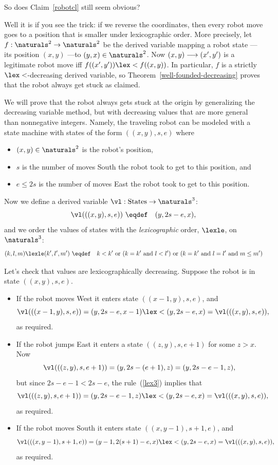 \begin{editingnotes}
So does Claim~\ref{robotcl} still seem obvious?

Well it is if you see the trick: if we reverse the coordinates, then every
robot move goes to a position that is smaller under lexicographic order.
More precisely, let $f:\naturals^2 \to \naturals^2$ be the derived variable
mapping a robot state ---its position $(x,y)$ ---to $(y,x) \in
\naturals^2$.  Now $(x,y)\mathrel{\longrightarrow} (x',y')$ is a legitimate robot move iff
$f((x',y')) \lex< f((x,y))$.  In particular, $f$ is a strictly
$\lex<$-decreasing derived variable, so
Theorem~\ref{well-founded-decreasing} proves that the robot always get
stuck as claimed.
\end{editingnotes}

\iffalse

We will prove that the robot always gets stuck at the origin by
generalizing the decreasing variable method, but with decreasing values
that are more general than nonnegative integers.  Namely, the traveling robot
can be modeled with a state machine with states of the form $((x,y),s,e)$
where
\begin{itemize}
\item $(x,y) \in \naturals^2$ is the robot's position,
\item $s$ is the number of moves South the robot took to get to this
position, and
\item $e \le 2s$ is the number of moves East the robot took to get to this
position. 
\end{itemize}

Now we define a derived variable $\vl:\text{States}\to \naturals^3$:
\[
\vl(((x,y),s,e)) \ \eqdef\quad (y,2s-e,x),
\]
and we order the values of states with the \emph{lexicographic} order,
$\lexle$, on $\naturals^3$:
\begin{equation}\label{lex3}
(k,l,m) \lexle (k',l',m') \ \eqdef\quad k < k' \text{ or } (k=k' \text{
and } l < l') \text{ or } (k=k' \text{ and } l = l' \text{ and } m \le m')
\end{equation}

Let's check that values are lexicographically decreasing.  Suppose the
robot is in state $((x,y),s,e)$.
\begin{itemize}
\item If the robot moves West it enters state $((x-1,y),s,e)$, and
\[
\vl(((x-1,y),s,e)) = (y,2s-e,x-1) \lex< (y,2s-e,x) = \vl(((x,y),s,e)),
\]
as required.


\item If the robot jumps East it enters a state $((z,y),s,e+1)$ for some
$z>x$.  Now
\[
\vl(((z,y),s,e+1)) = (y,2s-(e+1),z) = (y,2s-e-1,z),
\]
but since $2s-e-1 < 2s-e$, the rule~(\ref{lex3}) implies that
\[
\vl(((z,y),s,e+1)) = (y,2s-e-1,z)  \lex< (y,2s-e,x) = \vl(((x,y),s,e)),
\]
as required.

\item If the robot moves South it enters state $((x,y-1),s+1,e)$, and
\[
\vl(((x,y-1),s+1,e)) = (y-1,2(s+1)-e,x) \lex< (y,2s-e,x) = \vl(((x,y),s,e)),
\]
as required.

\end{itemize}

